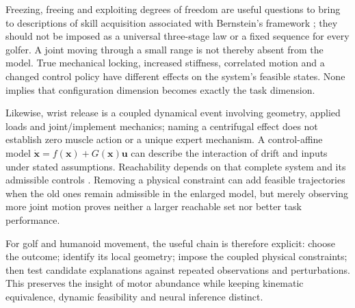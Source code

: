 Freezing, freeing and exploiting degrees of freedom are useful questions to
bring to descriptions of skill acquisition associated with Bernstein's
framework \cite{Bernstein1967}; they should not be imposed as a universal
three-stage law or a fixed sequence for every golfer.
A joint moving through a small range is not thereby absent from the model.
True mechanical locking, increased stiffness, correlated motion and a changed
control policy have different effects on the system's feasible states.
None implies that configuration dimension becomes exactly the task dimension.

Likewise, wrist release is a coupled dynamical event involving geometry,
applied loads and joint/implement mechanics; naming a centrifugal effect does
not establish zero muscle action or a unique expert mechanism.
A control-affine model $\dot{\bm x}=f(\bm x)+G(\bm x)\bm u$ can describe the
interaction of drift and inputs under stated assumptions.
Reachability depends on that complete system and its admissible controls
\cite{AgrachevSachkov2004}.
Removing a physical constraint can add feasible trajectories when the old
ones remain admissible in the enlarged model, but merely observing more joint
motion proves neither a larger reachable set nor better task performance.

For golf and humanoid movement, the useful chain is therefore explicit:
choose the outcome; identify its local geometry; impose the coupled physical
constraints; then test candidate explanations against repeated observations
and perturbations. This preserves the insight of motor abundance while
keeping kinematic equivalence, dynamic feasibility and neural inference distinct.

\clearpage
